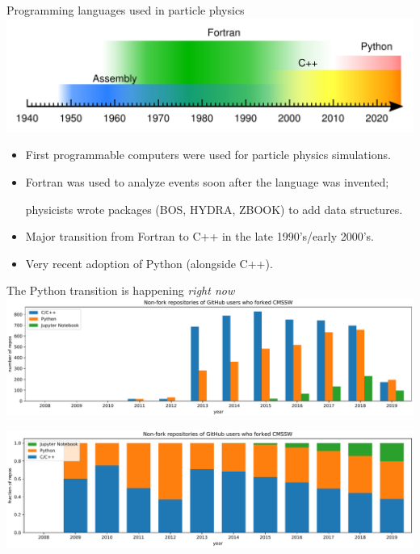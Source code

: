 \documentclass[aspectratio=169]{beamer}
\begin{document}
\begin{frame}{Programming languages used in particle physics}
\large
\vspace{0.5 cm}
\includegraphics[width=\linewidth]{programming-languages.pdf}

\begin{itemize}\setlength{\itemsep}{0.2 cm}
\item First programmable computers were used for particle physics simulations.
\item Fortran was used to analyze events soon after the language was invented;

physicists wrote packages (BOS, HYDRA, ZBOOK) to add data structures.

\item Major transition from Fortran to C++ in the late 1990's/early 2000's.
\item Very recent adoption of Python (alongside C++).
\end{itemize}
\end{frame}

\begin{frame}{The Python transition is happening {\it right now}}
\vspace{0.2 cm}
\includegraphics[width=\linewidth]{github-cmssw-lin.pdf}

\includegraphics[width=\linewidth]{github-cmssw-frac.pdf}
\end{frame}
\end{document}
